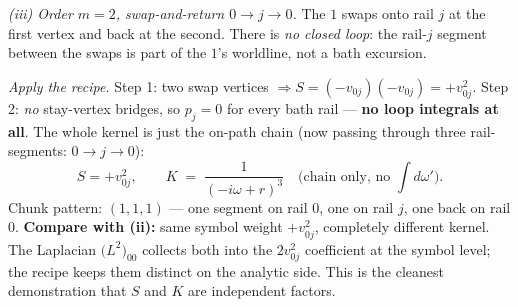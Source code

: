\documentclass[11pt,a4paper]{article}
\begin{document}
\medskip
\textit{(iii) Order $m{=}2$, swap-and-return $0\!\to\!j\!\to\!0$.}
The $1$ swaps onto rail $j$ at the first vertex and back at the second.
There is \emph{no closed loop}: the rail-$j$ segment between the swaps is
part of the $1$'s worldline, not a bath excursion.
\begin{center}
\end{center}
\textit{Apply the recipe.}
\;Step 1: two swap vertices $\Rightarrow S = (-v_{0j})(-v_{0j}) = +v_{0j}^{2}$.
\;Step 2: \emph{no} stay-vertex bridges, so $p_{j}{=}0$ for every bath
rail --- \textbf{no loop integrals at all}. The whole kernel is just the
on-path chain (now passing through three rail-segments: $0\!\to\!j\!\to\!0$):
\[
S = +v_{0j}^{2},\qquad
K \;=\; \frac{1}{(-i\omega+r)^{3}}\quad\text{(chain only, no $\int d\omega'$)}.
\]
Chunk pattern: $(1,1,1)$ --- one segment on rail $0$, one on rail $j$,
one back on rail $0$. \textbf{Compare with (ii):} same symbol weight
$+v_{0j}^{2}$, completely different kernel. The Laplacian
$\big(L^{2}\big)_{00}$ collects both into the $2v_{0j}^{2}$ coefficient
at the symbol level; the recipe keeps them distinct on the analytic
side. This is the cleanest demonstration that $S$ and $K$ are
independent factors.
\end{document}
